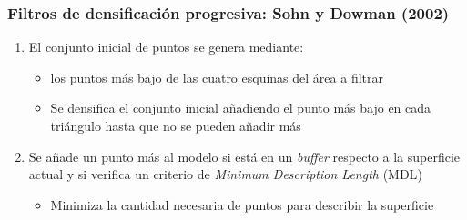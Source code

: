 \begin{frame}
  \frametitle{Filtros de densificación progresiva: Sohn y Dowman (2002)}
  \begin{enumerate}
    \item El conjunto inicial de puntos se genera mediante:
      \begin{itemize}
        \item los puntos más bajo de las cuatro esquinas del área a filtrar
        \item Se densifica el conjunto inicial añadiendo el punto más bajo 
          en cada triángulo hasta que no se pueden añadir más
      \end{itemize}
    \item Se añade un punto más al modelo si está en un \emph{buffer} respecto a
      la superficie actual y si verifica un criterio de \emph{Minimum
      Description Length} (\alert{MDL})
      \begin{itemize}
        \item Minimiza la cantidad necesaria de puntos para describir la
          superficie
      \end{itemize}
  \end{enumerate}
\end{frame}
